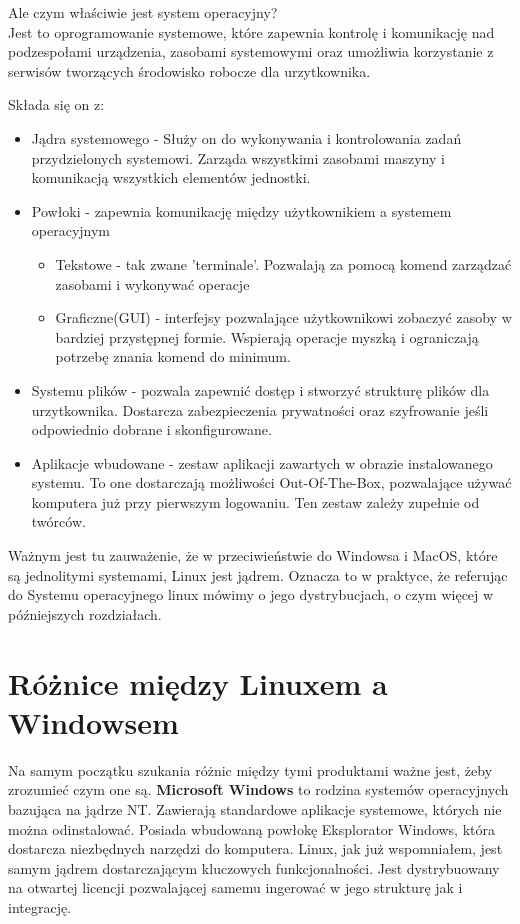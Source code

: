 \documentclass[10pt,a4paper]{report}
\begin{document}
Ale czym właściwie jest system operacyjny?\\

Jest to oprogramowanie systemowe, które zapewnia kontrolę i komunikację nad podzespołami urządzenia, zasobami systemowymi oraz umożliwia korzystanie z serwisów tworzących środowisko robocze dla urzytkownika.

Składa się on z:
\begin{itemize}
\item Jądra systemowego - Służy on do wykonywania i kontrolowania zadań przydzielonych systemowi. Zarząda wszystkimi zasobami maszyny i komunikacją wszystkich elementów jednostki.
\item Powłoki - zapewnia komunikację między użytkownikiem a systemem operacyjnym

\begin{itemize}
\item Tekstowe - tak zwane 'terminale'. Pozwalają za pomocą komend zarządzać zasobami i wykonywać operacje
\item Graficzne(GUI) - interfejsy pozwalające użytkownikowi zobaczyć zasoby w bardziej przystępnej formie. Wspierają operacje myszką i ograniczają potrzebę znania komend do minimum.
\end{itemize}

\item Systemu plików - pozwala zapewnić dostęp i stworzyć strukturę plików dla urzytkownika. Dostarcza zabezpieczenia prywatności oraz szyfrowanie jeśli odpowiednio dobrane i skonfigurowane.
\item Aplikacje wbudowane - zestaw aplikacji zawartych w obrazie instalowanego systemu. To one dostarczają możliwości Out-Of-The-Box, pozwalające używać komputera już przy pierwszym logowaniu. Ten zestaw zależy zupełnie od twórców.
\end{itemize}
	
Ważnym jest tu zauważenie, że w przeciwieństwie do Windowsa i MacOS, które są jednolitymi systemami, Linux jest jądrem. Oznacza to w praktyce, że referując do Systemu operacyjnego linux mówimy o jego dystrybucjach, o czym więcej w późniejszych rozdziałach.
	\section{Różnice między Linuxem a Windowsem}
	
Na samym początku szukania różnic między tymi produktami ważne jest, żeby zrozumieć czym one są. \textbf{Microsoft Windows} to rodzina systemów operacyjnych bazująca na jądrze NT. Zawierają standardowe aplikacje systemowe, których nie można odinstalować. Posiada wbudowaną powłokę Eksplorator Windows, która dostarcza niezbędnych narzędzi do komputera. Linux, jak już wspomniałem, jest samym jądrem dostarczającym kluczowych funkcjonalności. Jest dystrybuowany na otwartej licencji pozwalającej samemu ingerować w jego strukturę jak i integrację. 
\end{document}
